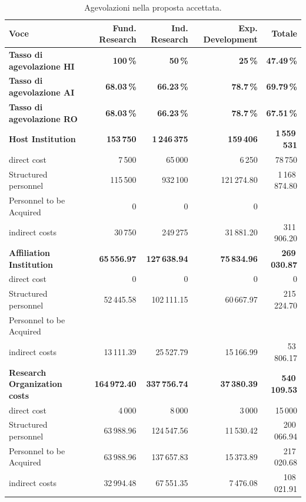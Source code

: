 \documentclass{plan4ari_report}
\begin{document}
\begin{table}[H]\centering\small
\caption{Agevolazioni nella proposta accettata.}\label{tab:acc-age}
\begin{tabular}{lrrrr}\toprule
\textbf{Voce} & \textbf{Fund. Research} & \textbf{Ind. Research} & \textbf{Exp. Development} & \textbf{Totale} \\\midrule
\textbf{Tasso di agevolazione HI} & \textbf{100\,\%} & \textbf{50\,\%} & \textbf{25\,\%} & \textbf{47.49\,\%} \\
\textbf{Tasso di agevolazione AI} & \textbf{68.03\,\%} & \textbf{66.23\,\%} & \textbf{78.7\,\%} & \textbf{69.79\,\%} \\
\textbf{Tasso di agevolazione RO} & \textbf{68.03\,\%} & \textbf{66.23\,\%} & \textbf{78.7\,\%} & \textbf{67.51\,\%} \\
\textbf{Host Institution} & \textbf{153\,750} & \textbf{1\,246\,375} & \textbf{159\,406} & \textbf{1\,559\,531} \\
\quad direct cost & 7\,500 & 65\,000 & 6\,250 & 78\,750 \\
\quad Structured personnel & 115\,500 & 932\,100 & 121\,274.80 & 1\,168\,874.80 \\
\quad Personnel to be Acquired & 0 & 0 & 0 &  \\
\quad indirect costs & 30\,750 & 249\,275 & 31\,881.20 & 311\,906.20 \\
\textbf{Affiliation Institution} & \textbf{65\,556.97} & \textbf{127\,638.94} & \textbf{75\,834.96} & \textbf{269\,030.87} \\
\quad direct cost & 0 & 0 & 0 & 0 \\
\quad Structured personnel & 52\,445.58 & 102\,111.15 & 60\,667.97 & 215\,224.70 \\
\quad Personnel to be Acquired &  &  &  &  \\
\quad indirect costs & 13\,111.39 & 25\,527.79 & 15\,166.99 & 53\,806.17 \\
\textbf{Research Organization costs} & \textbf{164\,972.40} & \textbf{337\,756.74} & \textbf{37\,380.39} & \textbf{540\,109.53} \\
\quad direct cost & 4\,000 & 8\,000 & 3\,000 & 15\,000 \\
\quad Structured personnel & 63\,988.96 & 124\,547.56 & 11\,530.42 & 200\,066.94 \\
\quad Personnel to be Acquired & 63\,988.96 & 137\,657.83 & 15\,373.89 & 217\,020.68 \\
\quad indirect costs & 32\,994.48 & 67\,551.35 & 7\,476.08 & 108\,021.91 \\

\end{tabular}
\end{table}
\end{document}
